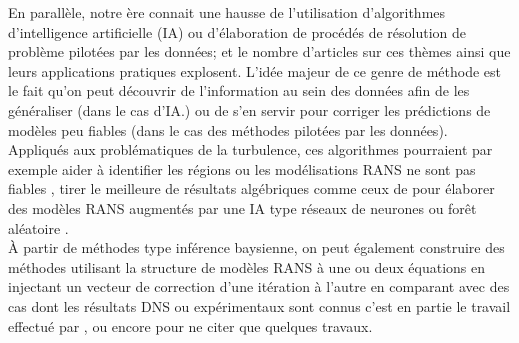 \documentclass[a4paper,12pt]{article}
\numberwithin{equation}{section} %
\begin{document}
En parallèle, notre ère connait une hausse de l'utilisation d'algorithmes d'intelligence artificielle (IA) ou d'élaboration de procédés de résolution de problème pilotées par les données; et le nombre d'articles sur ces thèmes ainsi que leurs applications pratiques explosent. L'idée majeur de ce genre de méthode est le fait qu'on peut découvrir de l'information au sein des données afin de les généraliser (dans le cas d'IA.) ou de s'en servir pour corriger les prédictions de modèles peu fiables (dans le cas des méthodes pilotées par les données).\\
Appliqués aux problématiques de la turbulence, ces algorithmes pourraient par exemple aider à identifier les régions ou les modélisations RANS ne sont pas fiables \citep{ling2015evaluation}, tirer le meilleure de résultats algébriques comme ceux de \citep{pope1975more} pour élaborer des modèles RANS augmentés par une IA type réseaux de neurones ou forêt aléatoire \citep{ling2016machine}.\\
À partir de méthodes type inférence baysienne, on peut également construire des méthodes utilisant la structure de modèles RANS à une ou deux équations en injectant un vecteur de correction d'une itération à l'autre en comparant avec des cas dont les résultats DNS ou expérimentaux sont connus c'est en partie le travail effectué par \citep{singh2017machine}, \citep{parish2016paradigm} ou encore \citep{tracey2015machine} pour ne citer que quelques travaux.\\

   
\pagebreak



\end{document}
